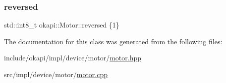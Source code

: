 \mbox{\label{classokapi_1_1Motor_ad5d21f1324cc2dc887075eb11c38149d}} 
\subsubsection{\texorpdfstring{reversed}{reversed}}
{\footnotesize\ttfamily std\+::int8\+\_\+t okapi\+::\+Motor\+::reversed \{1\}\hspace{0.3cm}{\ttfamily [protected]}}



The documentation for this class was generated from the following files\+:\begin{DoxyCompactItemize}
\item 
include/okapi/impl/device/motor/\mbox{\hyperlink{motor_8hpp}{motor.\+hpp}}\item 
src/impl/device/motor/\mbox{\hyperlink{motor_8cpp}{motor.\+cpp}}\end{DoxyCompactItemize}
